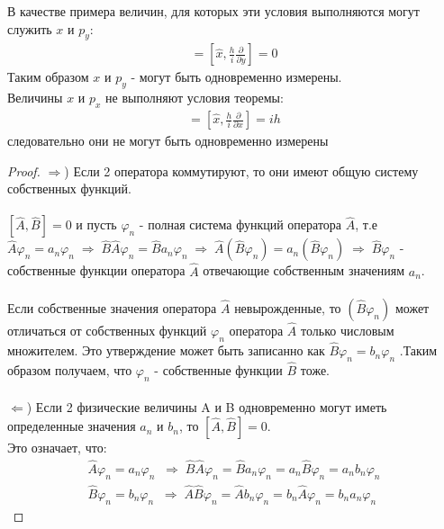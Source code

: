 \documentclass[__main__.tex]{subfiles}
\begin{document}
В качестве примера величин, для которых эти условия выполняются могут служить $x$ и $p_y$: 
\begin{gather*}
[\hat{x},\hat{p_y}] = \left[\hat{x},\frac{h}{i}\frac{\partial}{\partial y}\right] = 0
\end{gather*}
Таким образом $x$ и $p_y$ - могут быть одновременно измерены.\\
Величины $x$ и $p_x$ не выполняют условия теоремы:
\begin{gather*}
[\hat{x},\hat{p_x}] = \left[\hat{x},\frac{h}{i}\frac{\partial}{\partial x}\right] = ih
\end{gather*}
следовательно они не могут быть одновременно измерены
\begin{proof}
	$\Rightarrow$) Если 2 оператора коммутируют, то они имеют общую систему собственных функций.\\\\
	$[\hat{A},\hat{B}]=0$ и пусть ${\varphi_n}$ - полная система функций оператора $\hat{A}$, т.е $\hat{A}\varphi_n = a_n\varphi_n \; \Rightarrow \; \hat{B}\hat{A}\varphi_n = \hat{B}a_n\varphi_n \; \Rightarrow \; \hat{A}(\hat{B}\varphi_n) = a_n(\hat{B}\varphi_n) \; \Rightarrow \; \hat{B}\varphi_n$ - собственные функции оператора $\hat{A}$ отвечающие собственным значениям $a_n$.  \\\\
	
	Если собственные значения оператора $\hat{A}$ невырожденные, то $(\hat{B}\varphi_n)$ может отличаться от собственных функций $\varphi_n$ оператора $\hat{A}$ только числовым множителем. Это утверждение может быть записанно как $\hat{B}\varphi_n = b_n\varphi_n$ .Таким образом получаем, что $\varphi_n$ - собственные функции $\hat{B}$ тоже.\\\\
	$\Leftarrow$) Если 2 физические величины A и B одновременно могут иметь определенные значения $a_n$ и $b_n$, то $[\hat{A},\hat{B}] = 0$.\\
	
	Это означает, что:
	\begin{gather*}
	\hat{A}\varphi_n = a_n\varphi_n \;\; \Rightarrow \; \hat{B}\hat{A}\varphi_n=\hat{B}a_n\varphi_n=a_n\hat{B}\varphi_n=a_nb_n\varphi_n\\
	\hat{B}\varphi_n = b_n\varphi_n \;\; \Rightarrow \;
	\hat{A}\hat{B}\varphi_n=\hat{A}b_n\varphi_n = b_n\hat{A}\varphi_n = b_na_n\varphi_n
	\end{gather*}
\end{proof}
\end{document}
